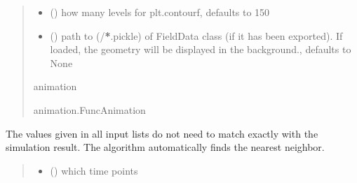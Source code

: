 \documentclass[letterpaper,10pt,english]{sphinxmanual}
\begin{document}
\begin{fulllineitems}
\begin{fulllineitems}
\begin{quote}
\begin{description}
\begin{itemize}
\item {} 
\sphinxAtStartPar
{} (\sphinxstyleliteralemphasis{\sphinxupquote{, }}) \textendash{} how many levels for plt.contourf, defaults to 150

\item {} 
\sphinxAtStartPar
{} (\sphinxstyleliteralemphasis{\sphinxupquote{, }}) \textendash{} path to (/{\color{red}\bfseries{}*}.pickle) of FieldData class (if it has been exported). If loaded, the geometry will be displayed in the background., defaults to None

\end{itemize}

\sphinxAtStartPar
animation

\sphinxAtStartPar
animation.FuncAnimation

\end{description}\end{quote}

\end{fulllineitems}


\begin{fulllineitems}
\label{\detokenize{tscw_module:tscw_module.tscw_DataClassesOutput.TSCW_TFBH.plot_temp_distribution}}
\pysigstartsignatures
{}
\pysigstopsignatures
\sphinxAtStartPar
The values given in all input lists do not need to match exactly with the simulation result.
The algorithm automatically finds the nearest neighbor.
\begin{quote}\begin{description}
\begin{itemize}
\item {} 
\sphinxAtStartPar
{} () \textendash{} which time points


\end{itemize}
\end{description}
\end{quote}
\end{fulllineitems}
\end{fulllineitems}
\end{document}
